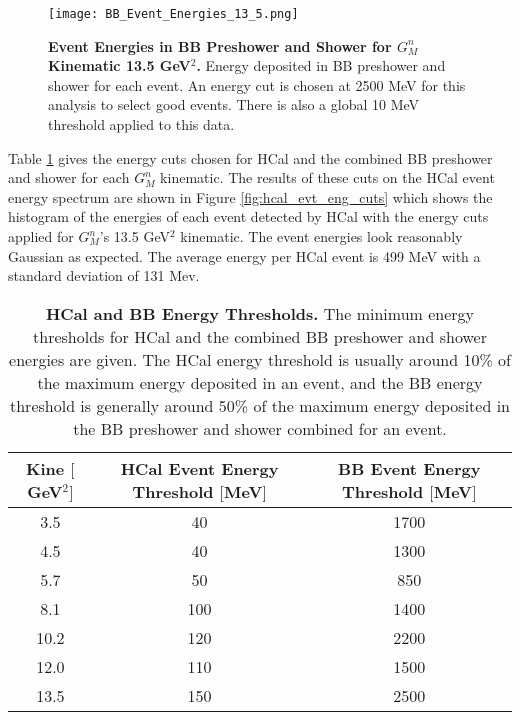 \documentclass[10pt]{article}
\begin{document}
	\begin{figure}[!ht]
	\begin{center}
	\texttt{[image: BB\_Event\_Energies\_13\_5.png]}
	\end{center}
	\caption{
	{\bf{Event Energies in BB Preshower and Shower for $G_M^n$ Kinematic 13.5 GeV$^2$.}} Energy deposited in BB preshower and shower for each event. An energy cut is chosen at 2500 MeV for this analysis to select good events. There is also a global 10 MeV threshold applied to this data.}
	\label{fig:bb_evt_eng}
	\end{figure}

Table \ref{tab:thresholds} gives the energy cuts chosen for HCal and the combined BB preshower and shower for each $G_M^n$ kinematic. The results of these cuts on the HCal event energy spectrum are shown in Figure \ref{fig:hcal_evt_eng_cuts} which shows the histogram of the energies of each event detected by HCal with the energy cuts applied for $G_M^n$'s 13.5 GeV$^2$ kinematic. The event energies look reasonably Gaussian as expected. The average energy per HCal event is 499 MeV with a standard deviation of 131 Mev. \\
	
	\begin{table}[h]
	\centering
	\begin{tabular}{|c|cc|}
	\hline
	\makecell{Kine\\$[$GeV$^2]$} & \makecell{HCal Event Energy\\Threshold $[$MeV$]$} & \makecell{BB Event Energy\\Threshold $[$MeV$]$}\\
	\hline
	3.5 & 40 & 1700\\
    4.5 & 40 & 1300\\
    5.7 & 50 & 850\\
    8.1 & 100 & 1400\\
    10.2 & 120 & 2200\\
    12.0 & 110 & 1500\\
    13.5 & 150 & 2500\\
	\hline
	\end{tabular}
	\caption{{\bf{HCal and BB Energy Thresholds.}} The minimum energy thresholds for HCal and the combined BB preshower and shower energies are given. The HCal energy threshold is usually around 10\% of the maximum energy deposited in an event, and the BB energy threshold is generally around 50\% of the maximum energy deposited in the BB preshower and shower combined for an event.} %
	\label{tab:thresholds}
	\end{table}
	
\end{document}
